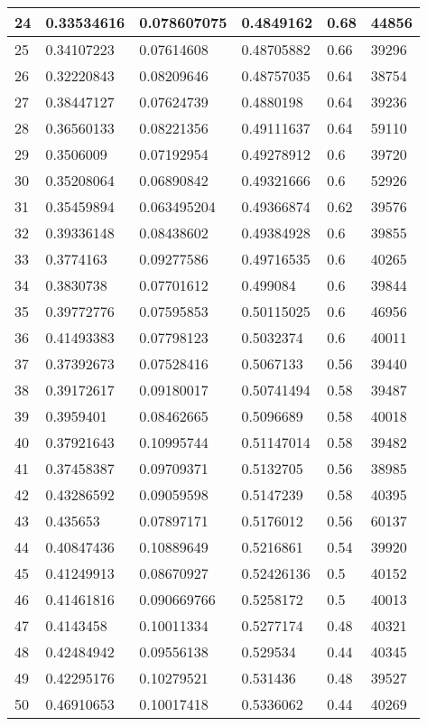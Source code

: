 \begin{longtable}{|l|l|l|l|l|l|}
24 & 0.33534616 & 0.078607075 & 0.4849162 & 0.68 & 44856 \\ \hline 
25 & 0.34107223 & 0.07614608 & 0.48705882 & 0.66 & 39296 \\ \hline 
26 & 0.32220843 & 0.08209646 & 0.48757035 & 0.64 & 38754 \\ \hline 
27 & 0.38447127 & 0.07624739 & 0.4880198 & 0.64 & 39236 \\ \hline 
28 & 0.36560133 & 0.08221356 & 0.49111637 & 0.64 & 59110 \\ \hline 
29 & 0.3506009 & 0.07192954 & 0.49278912 & 0.6 & 39720 \\ \hline 
30 & 0.35208064 & 0.06890842 & 0.49321666 & 0.6 & 52926 \\ \hline 
31 & 0.35459894 & 0.063495204 & 0.49366874 & 0.62 & 39576 \\ \hline 
32 & 0.39336148 & 0.08438602 & 0.49384928 & 0.6 & 39855 \\ \hline 
33 & 0.3774163 & 0.09277586 & 0.49716535 & 0.6 & 40265 \\ \hline 
34 & 0.3830738 & 0.07701612 & 0.499084 & 0.6 & 39844 \\ \hline 
35 & 0.39772776 & 0.07595853 & 0.50115025 & 0.6 & 46956 \\ \hline 
36 & 0.41493383 & 0.07798123 & 0.5032374 & 0.6 & 40011 \\ \hline 
37 & 0.37392673 & 0.07528416 & 0.5067133 & 0.56 & 39440 \\ \hline 
38 & 0.39172617 & 0.09180017 & 0.50741494 & 0.58 & 39487 \\ \hline 
39 & 0.3959401 & 0.08462665 & 0.5096689 & 0.58 & 40018 \\ \hline 
40 & 0.37921643 & 0.10995744 & 0.51147014 & 0.58 & 39482 \\ \hline 
41 & 0.37458387 & 0.09709371 & 0.5132705 & 0.56 & 38985 \\ \hline 
42 & 0.43286592 & 0.09059598 & 0.5147239 & 0.58 & 40395 \\ \hline 
43 & 0.435653 & 0.07897171 & 0.5176012 & 0.56 & 60137 \\ \hline 
44 & 0.40847436 & 0.10889649 & 0.5216861 & 0.54 & 39920 \\ \hline 
45 & 0.41249913 & 0.08670927 & 0.52426136 & 0.5 & 40152 \\ \hline 
46 & 0.41461816 & 0.090669766 & 0.5258172 & 0.5 & 40013 \\ \hline 
47 & 0.4143458 & 0.10011334 & 0.5277174 & 0.48 & 40321 \\ \hline 
48 & 0.42484942 & 0.09556138 & 0.529534 & 0.44 & 40345 \\ \hline 
49 & 0.42295176 & 0.10279521 & 0.531436 & 0.48 & 39527 \\ \hline 
50 & 0.46910653 & 0.10017418 & 0.5336062 & 0.44 & 40269 \\ \hline 
\end{longtable}